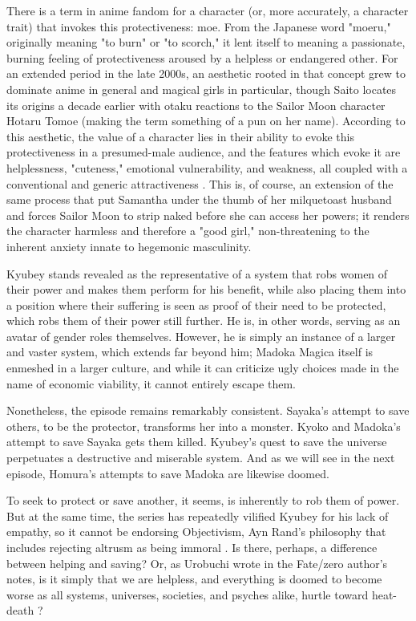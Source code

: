 There is a term in anime fandom for a character (or, more accurately, a character trait) that invokes this protectiveness: moe. From the Japanese word "moeru," originally meaning "to burn" or "to scorch," it lent itself to meaning a passionate, burning feeling of protectiveness aroused by a helpless or endangered other. For an extended period in the late 2000s, an aesthetic rooted in that concept grew to dominate anime in general and magical girls in particular, though Saito locates its origins a decade earlier with otaku reactions to the Sailor Moon character Hotaru Tomoe (making the term something of a pun on her name). \cite{ref71} According to this aesthetic, the value of a character lies in their ability to evoke this protectiveness in a presumed-male audience, and the features which evoke it are helplessness, "cuteness," emotional vulnerability, and weakness, all coupled with a conventional and generic attractiveness \cite{ref72}. This is, of course, an extension of the same process that put Samantha under the thumb of her milquetoast husband and forces Sailor Moon to strip naked before she can access her powers; it renders the character harmless and therefore a "good girl," non-threatening to the inherent anxiety innate to hegemonic masculinity.

Kyubey stands revealed as the representative of a system that robs women of their power and makes them perform for his benefit, while also placing them into a position where their suffering is seen as proof of their need to be protected, which robs them of their power still further. He is, in other words, serving as an avatar of gender roles themselves. However, he is simply an instance of a larger and vaster system, which extends far beyond him; Madoka Magica itself is enmeshed in a larger culture, and while it can criticize ugly choices made in the name of economic viability, it cannot entirely escape them.

Nonetheless, the episode remains remarkably consistent. Sayaka's attempt to save others, to be the protector, transforms her into a monster. Kyoko and Madoka's attempt to save Sayaka gets them killed. Kyubey's quest to save the universe perpetuates a destructive and miserable system. And as we will see in the next episode, Homura's attempts to save Madoka are likewise doomed.

To seek to protect or save another, it seems, is inherently to rob them of power. But at the same time, the series has repeatedly vilified Kyubey for his lack of empathy, so it cannot be endorsing Objectivism, Ayn Rand's philosophy that includes rejecting altrusm as being immoral \cite{ref73}. Is there, perhaps, a difference between helping and saving? Or, as Urobuchi wrote in the Fate/zero author's notes, is it simply that we are helpless, and everything is doomed to become worse as all systems, universes, societies, and psyches alike, hurtle toward heat-death \cite{ref74}? 
